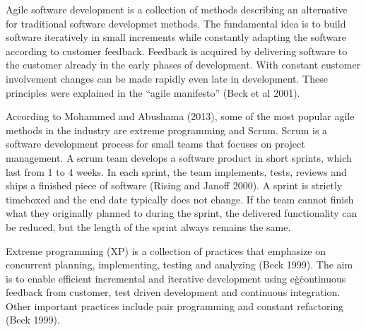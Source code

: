 Agile software development is a collection of methods describing an
alternative for traditional software developmet methods. The fundamental
idea is to build software iteratively in small increments while
constantly adapting the software according to customer feedback.
Feedback is acquired by delivering software to the customer already in
the early phases of development. With constant customer involvement
changes can be made rapidly even late in development. These principles were
explained in the ``agile manifesto'' (Beck et al 2001).

According to Mohammed and Abushama (2013), some of the most popular
agile methods in the industry are extreme programming and Scrum.
Scrum is a software development process for small teams that focuses
on project management. A scrum team develops a software product in
short sprints, which last from 1 to 4 weeks. In each sprint, the team
implements, tests, reviews and ships a finished piece of software
(Rising and Janoff 2000). A sprint is strictly timeboxed and the end
date typically does not change. If the team cannot finish what they
originally planned to during the sprint, the delivered functionality can
be reduced, but the length of the sprint always remains the same.

Extreme programming (XP) is a collection of practices that emphasize
on concurrent planning, implementing, testing and analyzing (Beck 1999). The
aim is to enable efficient incremental and iterative development
using e\.g\. continuous feedback from customer, test driven development
and continuous integration. Other important practices include pair
programming and constant refactoring (Beck 1999).

